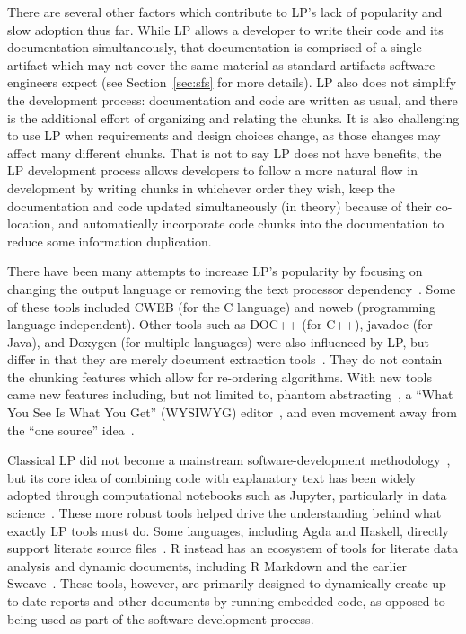 There are several other factors which contribute to LP's lack of popularity and 
slow adoption thus far. While LP allows a developer to write their code and its 
documentation simultaneously, that documentation is comprised of a single 
artifact which may not cover the same material as standard artifacts software 
engineers expect (see Section~\ref{sec:sfs} for more details). LP also does not 
simplify the development process: documentation and code are written as usual, 
and there is the additional effort of organizing and relating the chunks. It is
also challenging to use LP when requirements and design choices change, as those
changes may affect many different chunks. That is not to say LP does not have 
benefits, the LP development process allows developers to follow a more natural 
flow in development by writing chunks in whichever order they wish, keep the 
documentation and code updated simultaneously (in theory) 
because of their co-location, and automatically incorporate code chunks into 
the documentation to reduce some information duplication.

There have been many attempts to increase LP's popularity by focusing on
changing the output language or removing the text processor
dependency~\citep{PieterseKourieAndBoake2004}. Some of these tools included CWEB
(for the C language) and noweb (programming language independent). Other tools 
such as DOC++ (for C++), javadoc (for Java), and Doxygen
(for multiple languages) were also influenced by LP, but differ in that they are
merely document extraction tools~\citep{DOCppManual,OracleJavadoc,DoxygenManual}.
They do not contain the
chunking features which allow for re-ordering algorithms.
With new tools came new features including, but not limited to, phantom
abstracting~\citep{ShumAndCook1993}, a ``What You See Is What You Get'' (WYSIWYG)
editor~\citep{FritzsonGunnarssonAndJirstrand2002}, and even movement away from
the ``one source'' idea~\citep{Simonis2003}.

Classical LP did not become a mainstream software-development
methodology~\citep{JonesEtAl2020}, but its core idea of combining code with
explanatory text has been widely adopted through computational notebooks such
as Jupyter, particularly in data science~\citep{Jupyter,PimentelEtAl2019}. These
more robust tools helped drive the understanding behind what exactly LP tools
must do. Some languages, including Agda and Haskell,
directly support literate source files~\citep{AgdaLiterateProgramming,
GHCUsersGuide}. R instead has an ecosystem of tools for literate data analysis
and dynamic documents, including R Markdown and the earlier
Sweave~\citep{XieEtAl2018,Leisch2002}. These tools, however, are
primarily designed to dynamically create up-to-date reports and other documents
by running embedded code, as opposed to being used as part of the software
development process.

